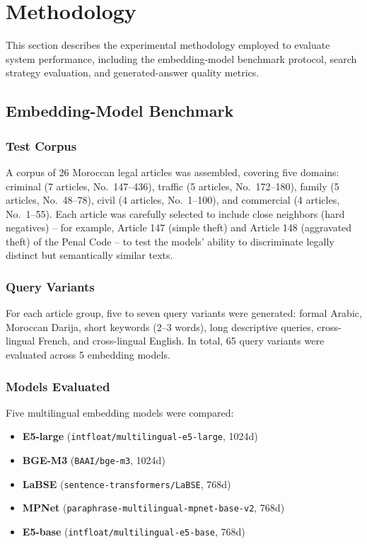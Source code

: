 \section{Methodology}
\label{sec:methodology}

This section describes the experimental methodology employed to evaluate
system performance, including the embedding-model benchmark protocol, search
strategy evaluation, and generated-answer quality metrics.

\subsection{Embedding-Model Benchmark}

\subsubsection{Test Corpus}

A corpus of 26 Moroccan legal articles was assembled, covering five domains:
criminal (7 articles, No.~147--436), traffic (5 articles, No.~172--180),
family (5 articles, No.~48--78), civil (4 articles, No.~1--100), and
commercial (4 articles, No.~1--55). Each article was carefully selected to
include close neighbors (hard negatives) -- for example, Article 147 (simple
theft) and Article 148 (aggravated theft) of the Penal Code -- to test the
models' ability to discriminate legally distinct but semantically similar
texts.

\subsubsection{Query Variants}

For each article group, five to seven query variants were generated: formal
Arabic, Moroccan Darija, short keywords (2--3 words), long descriptive
queries, cross-lingual French, and cross-lingual English. In total, 65 query
variants were evaluated across 5 embedding models.

\subsubsection{Models Evaluated}

Five multilingual embedding models were compared:
\begin{itemize}
  \item \textbf{E5-large} (\texttt{intfloat/multilingual-e5-large}, 1024d)
  \item \textbf{BGE-M3} (\texttt{BAAI/bge-m3}, 1024d)
  \item \textbf{LaBSE} (\texttt{sentence-transformers/LaBSE}, 768d)
  \item \textbf{MPNet} (\texttt{paraphrase-multilingual-mpnet-base-v2}, 768d)
  \item \textbf{E5-base} (\texttt{intfloat/multilingual-e5-base}, 768d)
\end{itemize}

